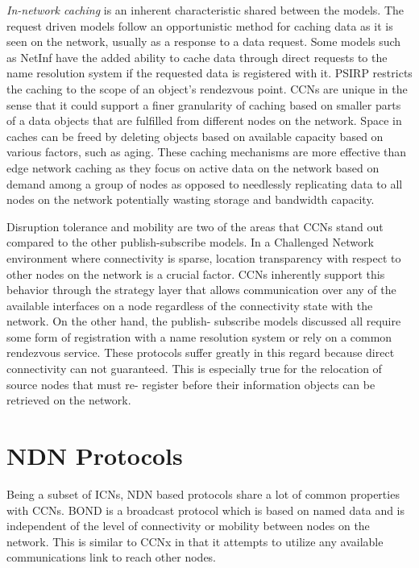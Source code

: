 \documentclass[a4paper,12pt]{report}      %
\begin{document}
\emph{In-network caching} is an inherent characteristic shared between the models. The request driven models
follow an opportunistic method for caching data as it is seen on the network, usually as a response to a
data request. Some models such as NetInf have the added ability to cache data through direct requests
to the name resolution system if the requested data is registered with it. PSIRP restricts the caching to
the scope of an object's rendezvous point. CCNs are unique in the sense that it could support a finer granularity of caching based on smaller parts of a data objects that are fulfilled from different nodes on
the network. Space in caches can be freed by deleting objects based on available capacity based on
various factors, such as aging. These caching mechanisms are more effective than edge network
caching as they focus on active data on the network based on demand among a group of nodes as
opposed to needlessly replicating data to all nodes on the network potentially wasting storage and
bandwidth capacity.

Disruption tolerance and mobility are two of the areas that CCNs stand out compared to the other
publish-subscribe models. In a Challenged Network environment where connectivity is sparse, location
transparency with respect to other nodes on the network is a crucial factor. CCNs inherently support
this behavior through the strategy layer that allows communication over any of the available interfaces
on a node regardless of the connectivity state with the network. On the other hand, the publish-
subscribe models discussed all require some form of registration with a name resolution system or rely
on a common rendezvous service. These protocols suffer greatly in this regard because direct
connectivity can not guaranteed. This is especially true for the relocation of source nodes that must re-
register before their information objects can be retrieved on the network\cite{dirk2941}.

\section{NDN Protocols}

Being a subset of ICNs, NDN based protocols share a lot of common properties with CCNs.
BOND \cite{bond} is a broadcast protocol which is based on named data and is independent of the
level of connectivity or mobility between nodes on the network. This is similar to CCNx in that it
attempts to utilize any available communications link to reach other nodes.
\end{document}
